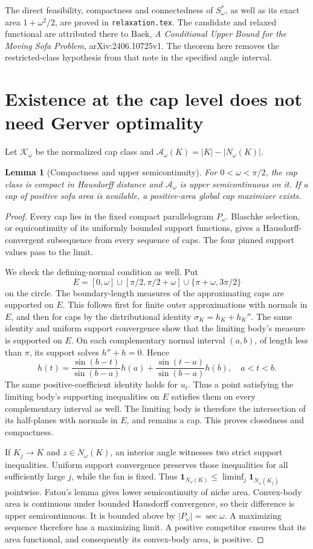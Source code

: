 \documentclass[11pt]{article}
\newtheorem{lemma}[theorem]{Lemma}
\begin{document}
The direct feasibility, compactness and connectedness of $S_\omega^*$, as well as its exact area $1+\omega^2/2$, are proved in \texttt{relaxation.tex}. The candidate and relaxed functional are attributed there to Baek, \emph{A Conditional Upper Bound for the Moving Sofa Problem}, arXiv:2406.10725v1. The theorem here removes the restricted-class hypothesis from that note in the specified angle interval.

\section{Existence at the cap level does not need Gerver optimality}
Let $\mathcal K_\omega$ be the normalized cap class and $\mathcal A_\omega(K)=|K|-|N_\omega(K)|$.

\begin{lemma}[Compactness and upper semicontinuity]\label{lem:existence}
For $0<\omega<\pi/2$, the cap class is compact in Hausdorff distance and $\mathcal A_\omega$ is upper semicontinuous on it. If a cap of positive sofa area is available, a positive-area global cap maximizer exists.
\end{lemma}
\begin{proof}
Every cap lies in the fixed compact parallelogram $P_\omega$. Blaschke selection, or equicontinuity of its uniformly bounded support functions, gives a Hausdorff-convergent subsequence from every sequence of caps. The four pinned support values pass to the limit.

We check the defining-normal condition as well. Put
\[
 E=[0,\omega]\cup[\pi/2,\pi/2+\omega]\cup\{\pi+\omega,3\pi/2\}
\]
on the circle. The boundary-length measures of the approximating caps are supported on $E$. This follows first for finite outer approximations with normals in $E$, and then for caps by the distributional identity $\sigma_K=h_K+h_K''$. The same identity and uniform support convergence show that the limiting body's measure is supported on $E$. On each complementary normal interval $(a,b)$, of length less than $\pi$, its support solves $h''+h=0$. Hence
\[
 h(t)=\frac{\sin(b-t)}{\sin(b-a)}h(a)+\frac{\sin(t-a)}{\sin(b-a)}h(b),\quad a<t<b.
\]
The same positive-coefficient identity holds for $u_t$. Thus a point satisfying the limiting body's supporting inequalities on $E$ satisfies them on every complementary interval as well. The limiting body is therefore the intersection of its half-planes with normals in $E$, and remains a cap. This proves closedness and compactness.

If $K_j\to K$ and $z\in N_\omega(K)$, an interior angle witnesses two strict support inequalities. Uniform support convergence preserves those inequalities for all sufficiently large $j$, while the fan is fixed. Thus $\mathbf1_{N_\omega(K)}\le\liminf_j\mathbf1_{N_\omega(K_j)}$ pointwise. Fatou's lemma gives lower semicontinuity of niche area. Convex-body area is continuous under bounded Hausdorff convergence, so their difference is upper semicontinuous. It is bounded above by $|P_\omega|=\sec\omega$. A maximizing sequence therefore has a maximizing limit. A positive competitor ensures that its area functional, and consequently its convex-body area, is positive.
\end{proof}
\end{document}
